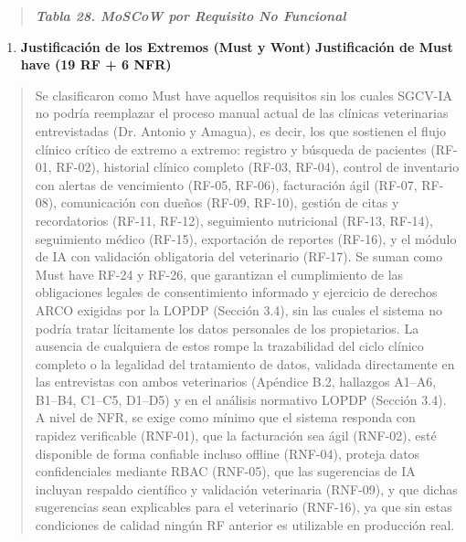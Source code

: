 \documentclass[
]{article}
\begin{document}
\begin{quote}
\protect{}\label{_bookmark106}{}\emph{\textbf{Tabla 28.
MoSCoW por Requisito No Funcional}}
\end{quote}

\begin{enumerate}
\def\labelenumi{\arabic{enumi}.}
\setcounter{enumi}{4}
\item
  \protect{}\label{_bookmark107}{}\textbf{Justificación de
  los Extremos (Must y Won\textquotesingle t)}
  \protect{}\label{_bookmark108}{}\textbf{Justificación de
  Must have (19 RF + 6 NFR)}
\end{enumerate}

\begin{quote}
Se clasificaron como Must have aquellos requisitos sin los cuales
SGCV-IA no podría reemplazar el proceso manual actual de las clínicas
veterinarias entrevistadas (Dr. Antonio y Amagua), es decir, los que
sostienen el flujo clínico crítico de extremo a extremo: registro y
búsqueda de pacientes (RF-01, RF-02), historial clínico completo (RF-03,
RF-04), control de inventario con alertas de vencimiento (RF-05, RF-06),
facturación ágil (RF-07, RF-08), comunicación con dueños (RF-09, RF-10),
gestión de citas y recordatorios (RF-11, RF-12), seguimiento nutricional
(RF-13, RF-14), seguimiento médico (RF-15), exportación de reportes
(RF-16), y el módulo de IA con validación obligatoria del veterinario
(RF-17). Se suman como Must have RF-24 y RF-26, que garantizan el
cumplimiento de las obligaciones legales de consentimiento informado y
ejercicio de derechos ARCO exigidas por la LOPDP (Sección 3.4), sin las
cuales el sistema no podría tratar lícitamente los datos personales de
los propietarios. La ausencia de cualquiera de estos rompe la
trazabilidad del ciclo clínico completo o la legalidad del tratamiento
de datos, validada directamente en las entrevistas con ambos
veterinarios (Apéndice B.2, hallazgos A1--A6, B1--B4, C1--C5, D1--D5) y
en el análisis normativo LOPDP (Sección 3.4). A nivel de NFR, se exige
como mínimo que el sistema responda con rapidez verificable (RNF-01),
que la facturación sea ágil (RNF-02), esté disponible de forma confiable
incluso offline (RNF-04), proteja datos confidenciales mediante RBAC
(RNF-05), que las sugerencias de IA incluyan respaldo científico y
validación veterinaria (RNF-09), y que dichas sugerencias sean
explicables para el veterinario (RNF-16), ya que sin estas condiciones
de calidad ningún RF anterior es utilizable en producción real.
\end{quote}
\end{document}
